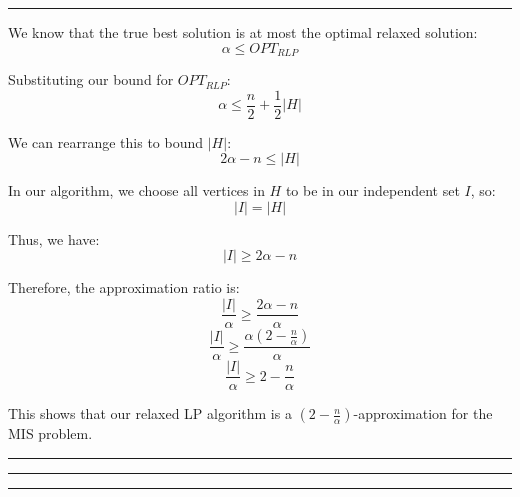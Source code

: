 \documentclass[11pt, english]{article}
\newenvironment{answer}{%
  \par\noindent\hrule %
  \vspace{0.25\baselineskip}%
  \noindent{\Large\bfseries Answer}\par\vspace{0.25\baselineskip}\noindent\ignorespaces
}{%
  \par\vspace{0.5\baselineskip}%
  \noindent\hrule\vspace{0.5\baselineskip}%
  \hrule\hrule
}
\begin{document}
\begin{answer}
We know that the true best solution is at most the optimal relaxed solution:
\[\alpha \leq OPT_{RLP}\]

Substituting our bound for $OPT_{RLP}$:
\[\alpha \leq \frac{n}{2} + \frac{1}{2} |H|\]

We can rearrange this to bound $|H|$:
\[2\alpha - n \leq |H|\]

In our algorithm, we choose all vertices in \( H \) to be in our independent set \( I \), so:
\[|I| = |H|\]

Thus, we have:
\[|I| \geq 2\alpha - n\]

Therefore, the approximation ratio is:
\[
\frac{|I|}{\alpha} \geq \frac{2\alpha - n}{\alpha}
\]
\[
\frac{|I|}{\alpha} \geq \frac{\alpha(2 - \frac{n}{\alpha})}{\alpha}
\]
\[\frac{|I|}{\alpha} \geq 2 - \frac{n}{\alpha}\]

This shows that our relaxed LP algorithm is a \( \left( 2 - \frac{n}{\alpha} \right) \)-approximation for the MIS problem.

\end{answer}
\end{document}
